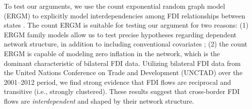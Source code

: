\documentclass[reqno,onecolumn,letterpaper,12pt]{article}
\begin{document}
To test our arguments, we use the count exponential random graph model (ERGM) to explicitly model interdependencies among FDI relationships between states \citep{krivitsky2012exponential}. The count ERGM is suitable for testing our argument for two reasons: (1) ERGM family models allow us to test precise hypotheses regarding dependent network structure, in addition to including conventional covariates \citep{desmarais2017statistical}; (2) the count ERGM is capable of modeling zero inflation in the network, which is the dominant characteristic of bilateral FDI data. Utilizing bilateral FDI data from the United Nations Conference on Trade and Development (UNCTAD) over the 2001--2012 period, we find strong evidence that FDI flows are reciprocal and transitive (i.e., strongly clustered). These results suggest that cross-border FDI flows are \textit{interdependent} and shaped by their network structure. %








\end{document}
